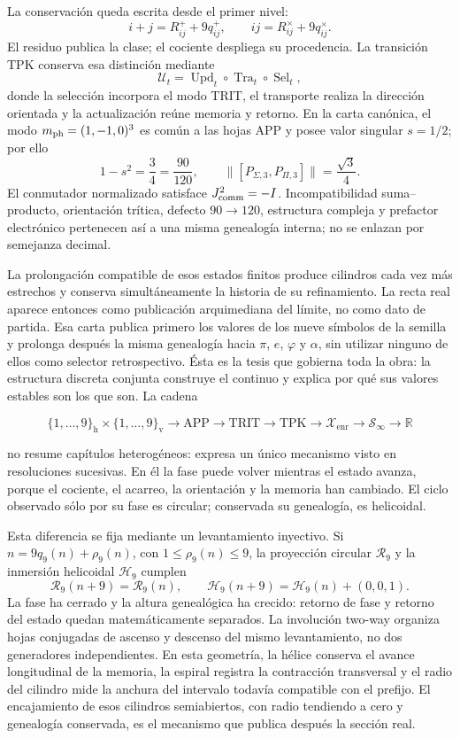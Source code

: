 La conservación queda escrita desde el primer nivel:
\[
i+j=R^+_{ij}+9q^+_{ij},
\qquad
ij=R^\times_{ij}+9q^\times_{ij}.
\]
El residuo publica la clase; el cociente despliega su procedencia. La
transición TPK conserva esa distinción mediante
\[
\mathcal U_t=
\operatorname{Upd}_t\circ
\operatorname{Tra}_t\circ
\operatorname{Sel}_t,
\]
donde la selección incorpora el modo TRIT, el transporte realiza la
dirección orientada y la actualización reúne memoria y retorno. En la carta
canónica, el modo \(m_{\rm ph}=(1,-1,0)^3\) es común a las hojas APP y posee
valor singular \(s=1/2\); por ello
\[
1-s^2=\frac34=\frac{90}{120},
\qquad
\bigl\|[P_{\Sigma,3},P_{\Pi,3}]\bigr\|
=\frac{\sqrt3}{4}.
\]
El conmutador normalizado satisface \(J_{\rm comm}^2=-I\). Incompatibilidad
suma--producto, orientación trítica, defecto \(90\to120\), estructura
compleja y prefactor electrónico pertenecen así a una misma genealogía
interna; no se enlazan por semejanza decimal.

La prolongación compatible de esos estados finitos produce cilindros cada
vez más estrechos y conserva simultáneamente la historia de su refinamiento.
La recta real aparece entonces como publicación arquimediana del límite, no
como dato de partida. Esa carta publica primero los valores de los nueve
símbolos de la semilla y prolonga después la misma genealogía hacia
\(\pi\), \(e\), \(\varphi\) y \(\alpha\), sin utilizar ninguno de ellos como
selector retrospectivo. Ésta es la tesis que gobierna toda la obra: la
estructura discreta conjunta construye el continuo y explica por qué sus
valores estables son los que son. La cadena

\[
\{1,\ldots,9\}_{\mathrm h}\times\{1,\ldots,9\}_{\mathrm v}
\longrightarrow \mathrm{APP}\longrightarrow\mathrm{TRIT}
\longrightarrow\mathrm{TPK}\longrightarrow\mathcal X_{\mathrm{enr}}
\longrightarrow\mathcal S_\infty
\longrightarrow\mathbb R
\]

no resume capítulos heterogéneos: expresa un único mecanismo visto en
resoluciones sucesivas. En él la fase puede volver mientras el estado avanza,
porque el cociente, el acarreo, la orientación y la memoria han cambiado. El
ciclo observado sólo por su fase es circular; conservada su genealogía, es
helicoidal.

Esta diferencia se fija mediante un levantamiento inyectivo. Si
\(n=9q_9(n)+\rho_9(n)\), con \(1\leq\rho_9(n)\leq9\), la proyección circular
\(\mathcal R_9\) y la inmersión helicoidal \(\mathcal H_9\) cumplen
\[
\mathcal R_9(n+9)=\mathcal R_9(n),\qquad
\mathcal H_9(n+9)=\mathcal H_9(n)+(0,0,1).
\]
La fase ha cerrado y la altura genealógica ha crecido: retorno de fase y
retorno del estado quedan matemáticamente separados. La involución two-way
organiza hojas conjugadas de ascenso y descenso del mismo levantamiento, no
dos generadores independientes. En esta geometría, la hélice conserva el
avance longitudinal de la memoria, la espiral registra la contracción
transversal y el radio del cilindro mide la anchura del intervalo todavía
compatible con el prefijo. El encajamiento de esos cilindros semiabiertos,
con radio tendiendo a cero y genealogía conservada, es el mecanismo que
publica después la sección real.

